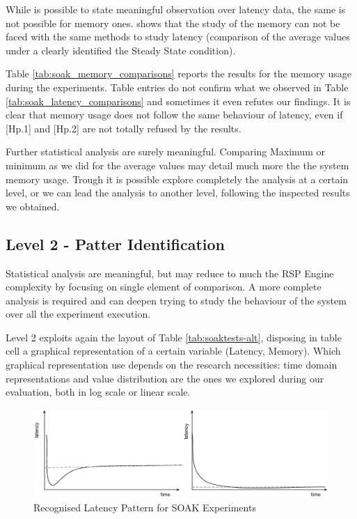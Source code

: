 While is possible to state meaningful observation over latency data, the same is not possible for memory ones. \name shows that the study of the memory can not be faced with the same methods to study latency (comparison of the average values under a clearly identified the Steady State condition). 

Table \ref{tab:soak_memory_comparisons} reports the results for the memory usage during the experiments. Table entries do not confirm what we observed in Table \ref{tab:soak_latency_comparisons} and sometimes it even refutes our findings. It is clear that memory usage does not follow the same behaviour of latency, even if [Hp.1] and [Hp.2] are not totally refused by the results.



Further statistical analysis are surely meaningful. Comparing Maximum or minimum as we did for the average values may detail much more the the system memory usage. Trough \name it is possible explore completely the analysis at a certain level, or we can lead the analysis to another level, following the inspected results we obtained.


\subsection{Level 2 - Patter Identification}\label{sec:eval-level2}

Statistical analysis are meaningful, but may reduce to much the RSP Engine complexity by focusing on single element of comparison. A more complete analysis is required and \name can deepen trying to study the behaviour of the system over all the experiment execution.

Level 2 exploits again the layout of Table \ref{tab:soaktests-alt}, disposing in table cell a graphical representation of a certain variable (Latency, Memory). Which graphical representation use depends on the research necessities: time domain representations and value distribution are the ones we explored during our evaluation, both in log scale or linear scale.

\begin{figure}[hbt]
  \centering
	\includegraphics[width=\linewidth]{images/level2-pattern}
	\caption[\textsc{Analyser} Investigation Stack - Level 2 - Recognised Latency Patterns for SOAK Experiments]{Recognised Latency Pattern for SOAK Experiments} 
  	\label{fig:level2-pattern}
\end{figure}

